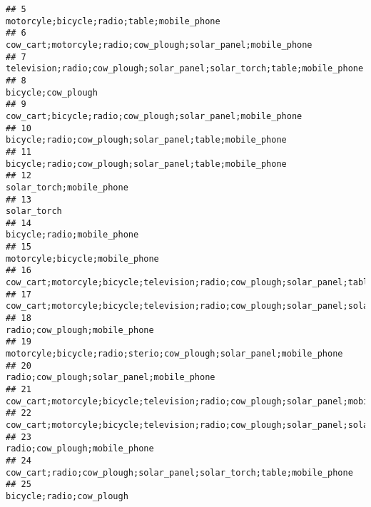 \documentclass[
]{article}
\begin{document}
\begin{verbatim}
## 5                                                                             motorcyle;bicycle;radio;table;mobile_phone
## 6                                                           cow_cart;motorcyle;radio;cow_plough;solar_panel;mobile_phone
## 7                                                 television;radio;cow_plough;solar_panel;solar_torch;table;mobile_phone
## 8                                                                                                     bicycle;cow_plough
## 9                                                             cow_cart;bicycle;radio;cow_plough;solar_panel;mobile_phone
## 10                                                               bicycle;radio;cow_plough;solar_panel;table;mobile_phone
## 11                                                               bicycle;radio;cow_plough;solar_panel;table;mobile_phone
## 12                                                                                              solar_torch;mobile_phone
## 13                                                                                                           solar_torch
## 14                                                                                            bicycle;radio;mobile_phone
## 15                                                                                        motorcyle;bicycle;mobile_phone
## 16                                 cow_cart;motorcyle;bicycle;television;radio;cow_plough;solar_panel;table;mobile_phone
## 17                           cow_cart;motorcyle;bicycle;television;radio;cow_plough;solar_panel;solar_torch;mobile_phone
## 18                                                                                         radio;cow_plough;mobile_phone
## 19                                                    motorcyle;bicycle;radio;sterio;cow_plough;solar_panel;mobile_phone
## 20                                                                             radio;cow_plough;solar_panel;mobile_phone
## 21                                       cow_cart;motorcyle;bicycle;television;radio;cow_plough;solar_panel;mobile_phone
## 22                           cow_cart;motorcyle;bicycle;television;radio;cow_plough;solar_panel;solar_torch;mobile_phone
## 23                                                                                         radio;cow_plough;mobile_phone
## 24                                                  cow_cart;radio;cow_plough;solar_panel;solar_torch;table;mobile_phone
## 25                                                                                              bicycle;radio;cow_plough

\end{verbatim}
\end{document}
